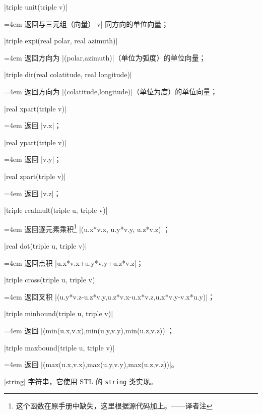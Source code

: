 \documentclass[nofonts,CJKnormalspaces]{ctexbook}[2009/05/20]
\makeatletter
\newenvironment{funclist}{\trivlist
  \parindent=0pt
\item[]
  \def\item{\medskip\par\leftskip=0pt}
  \def\go{\par\leftskip=4em}}
{\endtrivlist}
\newenvironment{typelist}{\itemize
  \let\old@item\@item
  \def\@item[##1]{\expandafter\old@item[\ttfamily\color{type!50!black}##1]}}
{\enditemize}
\newcommand\transnote[1]{\footnote{#1——译者注}}
\makeatother
\begin{document}
\begin{typelist}
\begin{funclist}
\item |triple unit(triple v)| \go
  返回与三元组（向量）|v| 同方向的单位向量；

\item |triple expi(real polar, real azimuth)| \go
  返回方向为 |(polar,azimuth)|（单位为弧度）的单位向量；

\item |triple dir(real colatitude, real longitude)| \go
  返回方向为 |(colatitude,longitude)|（单位为度）的单位向量；

\item |real xpart(triple v)| \go
  返回 |v.x|；

\item |real ypart(triple v)| \go
  返回 |v.y|；

\item |real zpart(triple v)| \go
  返回 |v.z|；

\item |triple realmult(triple u, triple v)| \go
  返回逐元素乘积\transnote{这个函数在原手册中缺失，这里根据源代码加上。}
  |(u.x*v.x, u.y*v.y, u.z*v.z)|；

\item |real dot(triple u, triple v)| \go
  返回点积 |u.x*v.x+u.y*v.y+u.z*v.z|；

\item |triple cross(triple u, triple v)| \go
  返回叉积 |(u.y*v.z-u.z*v.y,u.z*v.x-u.x*v.z,u.x*v.y-v.x*u.y)|；

\item |triple minbound(triple u, triple v)| \go
  返回 |(min(u.x,v.x),min(u.y,v.y),min(u.z,v.z))|；

\item |triple maxbound(triple u, triple v)| \go
  返回 |(max(u.x,v.x),max(u.y,v.y),max(u.z,v.z))|。
\end{funclist}

\item[string] 字符串，它使用 STL 的 \verb=string= 类实现。


\end{typelist}
\end{document}
